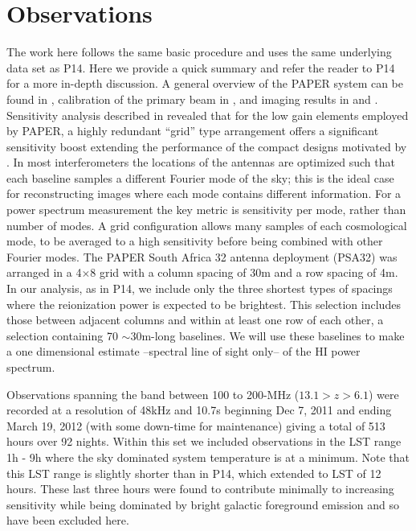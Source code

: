 \documentclass{aastex}
\begin{document}
\section{Observations}
\label{sec:observations}
The work here follows the same basic procedure and uses the same underlying data set as P14. Here we provide a quick summary and refer the reader to P14 for a more in-depth discussion.  A general overview of the PAPER system can be found in \cite{Parsons:2010p6757}, calibration of the primary beam in \cite{Pober:2012p8800}, and imaging results in \cite{Jacobs:2011p8438,jacobs:2013b} and \citet{Stefan:2013p9926}.  Sensitivity analysis described in \cite{Parsons:2012p9028} revealed that for the low gain elements employed by PAPER, a highly redundant ``grid'' type arrangement offers a significant sensitivity boost extending the performance of the compact designs motivated by \citet{Morales:2004p2494,Bowman:2006p1887,Lidz:2008p8251}.  In most interferometers the locations of the antennas are optimized such that each baseline samples a different Fourier mode of the sky; this is the ideal case for reconstructing images where each mode contains different information.  For a power spectrum measurement the key metric is sensitivity per mode, rather than number of modes.  A grid configuration allows many samples of each cosmological mode, to be averaged to a high sensitivity before being combined with other Fourier modes.  The PAPER South Africa 32 antenna deployment (PSA32) was arranged in a 4$\times$8 grid with a column spacing of 30m and a row spacing of 4m.  In our analysis, as in P14, we include only the three shortest types of spacings where the reionization power is expected to be brightest. This selection includes those between adjacent columns and within at least one row of each other, a selection containing 70 $\sim$30m-long baselines.  We will use these baselines to make a one dimensional estimate --spectral line of sight only-- of the HI power spectrum.

Observations spanning the band between 100 to 200-MHz ($13.1>z>6.1$) were recorded at a resolution of 48kHz and 10.7s  beginning Dec 7, 2011 and ending March 19, 2012 (with some down-time for maintenance) giving a total of 513 hours over 92 nights.  Within this set we included observations in the LST range 1h - 9h where the sky dominated system temperature is at a minimum.  Note that this LST range is slightly shorter than in P14, which extended to LST of 12 hours. These last three hours were found to contribute minimally to increasing sensitivity while being dominated by bright galactic foreground emission and so have been excluded here.
\end{document}
